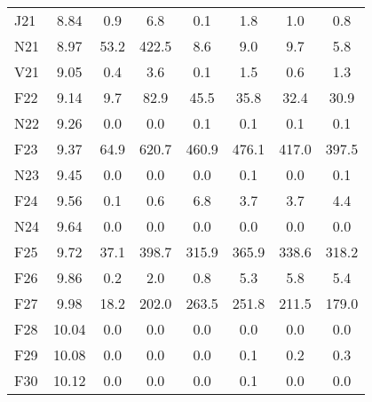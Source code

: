 \documentclass[article,crop=false]{standalone}%
\begin{document}
\begin{tabular}[h]{l c c c c c c c}
\rowcolor{white}%
J21&8.84&0.9&6.8&0.1&1.8&1.0&0.8\\%
\rowcolor{lightgray}%
N21&8.97&53.2&422.5&8.6&9.0&9.7&5.8\\%
\rowcolor{white}%
V21&9.05&0.4&3.6&0.1&1.5&0.6&1.3\\%
\rowcolor{lightgray}%
F22&9.14&9.7&82.9&45.5&35.8&32.4&30.9\\%
\rowcolor{white}%
N22&9.26&0.0&0.0&0.1&0.1&0.1&0.1\\%
\rowcolor{lightgray}%
F23&9.37&64.9&620.7&460.9&476.1&417.0&397.5\\%
\rowcolor{white}%
N23&9.45&0.0&0.0&0.0&0.1&0.0&0.1\\%
\rowcolor{lightgray}%
F24&9.56&0.1&0.6&6.8&3.7&3.7&4.4\\%
\rowcolor{white}%
N24&9.64&0.0&0.0&0.0&0.0&0.0&0.0\\%
\rowcolor{lightgray}%
F25&9.72&37.1&398.7&315.9&365.9&338.6&318.2\\%
\rowcolor{white}%
F26&9.86&0.2&2.0&0.8&5.3&5.8&5.4\\%
\rowcolor{lightgray}%
F27&9.98&18.2&202.0&263.5&251.8&211.5&179.0\\%
\rowcolor{white}%
F28&10.04&0.0&0.0&0.0&0.0&0.0&0.0\\%
\rowcolor{lightgray}%
F29&10.08&0.0&0.0&0.0&0.1&0.2&0.3\\%
\rowcolor{white}%
F30&10.12&0.0&0.0&0.0&0.1&0.0&0.0\\%
\hline%
\end{tabular}%
\end{document}
